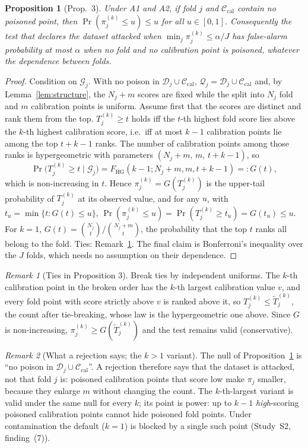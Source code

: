 \documentclass[11pt]{article}
\newtheorem{proposition}{Proposition}
\theoremstyle{definition}
\theoremstyle{remark}
\newtheorem{remark}{Remark}
\newcommand{\Cal}{\mathcal{C}_{\mathrm{cal}}}
\newcommand{\D}{\mathcal{D}}
\newcommand{\G}{\mathcal{G}}
\newcommand{\Q}{\mathcal{Q}}
\newcommand{\1}{\mathbf{1}}
\begin{document}
\begin{proposition}[Prop.~3]\label{prop:presence}
Under A1 and A2, if fold $j$ and $\Cal$ contain no poisoned point, then
$\Pr(\pi^{(k)}_j\le u)\le u$ for all $u\in[0,1]$. Consequently the test that declares the dataset
attacked when $\min_j\pi^{(k)}_j\le\alpha/J$ has false-alarm probability at most $\alpha$ when no
fold and no calibration point is poisoned, whatever the dependence between folds.
\end{proposition}

\begin{proof}
Condition on $\G_j$. With no poison in $\D_j\cup\Cal$, $\Q_j=\D_j\cup\Cal$ and, by
Lemma~\ref{lem:structure}, the $N_j+m$ scores are fixed while the split into $N_j$ fold and $m$
calibration points is uniform. Assume first that the scores are distinct and rank them from the
top. $T^{(k)}_j\ge t$ holds iff the $t$-th highest fold score lies above the $k$-th highest
calibration score, i.e.\ iff at most $k-1$ calibration points lie among the top $t+k-1$ ranks. The
number of calibration points among those ranks is hypergeometric with parameters
$(N_j+m,\,m,\,t+k-1)$, so
\[
\Pr\bigl(T^{(k)}_j\ge t\mid\G_j\bigr)=F_{\mathrm{HG}}(k-1;N_j+m,m,t+k-1)=:G(t),
\]
which is non-increasing in $t$. Hence $\pi^{(k)}_j=G(T^{(k)}_j)$ is the upper-tail probability of
$T^{(k)}_j$ at its observed value, and for any $u$, with $t_u=\min\{t:G(t)\le u\}$,
$\Pr(\pi^{(k)}_j\le u)=\Pr(T^{(k)}_j\ge t_u)=G(t_u)\le u$. For $k=1$,
$G(t)=\binom{N_j}{t}/\binom{N_j+m}{t}$, the probability that the top $t$ ranks all belong to the
fold. Ties: Remark~\ref{rem:ties-pres}. The final claim is Bonferroni's inequality over the $J$
folds, which needs no assumption on their dependence.
\end{proof}

\begin{remark}[Ties in Proposition 3]\label{rem:ties-pres}
Break ties by independent uniforms. The $k$-th calibration point in the broken order has the
$k$-th largest calibration value $v$, and every fold point with score strictly above $v$ is ranked
above it, so $T^{(k)}_j\le\tilde T^{(k)}_j$, the count after tie-breaking, whose law is the
hypergeometric one above. Since $G$ is non-increasing, $\pi^{(k)}_j\ge G(\tilde T^{(k)}_j)$ and the
test remains valid (conservative).
\end{remark}

\begin{remark}[What a rejection says; the $k>1$ variant]
The null of Proposition~\ref{prop:presence} is ``no poison in $\D_j\cup\Cal$''. A rejection
therefore says that the dataset is attacked, not that fold $j$ is: poisoned calibration points
that score low make $\pi_j$ smaller, because they enlarge $m$ without changing the count. The
$k$-th-largest variant is valid under the same null for every $k$; its point is power: up to $k-1$
\emph{high}-scoring poisoned calibration points cannot hide poisoned fold points. Under
contamination the default ($k=1$) is blocked by a single such point (Study~S2, finding~(7)).
\end{remark}
\end{document}
